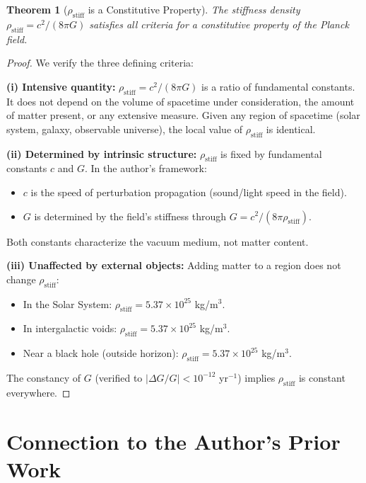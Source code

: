 \documentclass[11pt,a4paper]{article}
\newcommand{\rhostiff}{\ensuremath{\rho_{\mathrm{stiff}}}}
\newtheorem{theorem}{Theorem}
\theoremstyle{definition}
\begin{document}
\begin{theorem}[$\rhostiff$ is a Constitutive Property]
\label{thm:rho_stiff_constitutive}
The stiffness density $\rhostiff = c^2/(8\pi G)$ satisfies all criteria for a constitutive property of the Planck field.
\end{theorem}

\begin{proof}
We verify the three defining criteria:

\textbf{(i) Intensive quantity:} $\rhostiff = c^2/(8\pi G)$ is a ratio of fundamental constants. It does not depend on the volume of spacetime under consideration, the amount of matter present, or any extensive measure. Given any region of spacetime (solar system, galaxy, observable universe), the local value of $\rhostiff$ is identical.

\textbf{(ii) Determined by intrinsic structure:} $\rhostiff$ is fixed by fundamental constants $c$ and $G$. In the author's framework:
\begin{itemize}
    \item $c$ is the speed of perturbation propagation (sound/light speed in the field).
    \item $G$ is determined by the field's stiffness through $G = c^2/(8\pi\rhostiff)$.
\end{itemize}
Both constants characterize the vacuum medium, not matter content.

\textbf{(iii) Unaffected by external objects:} Adding matter to a region does not change $\rhostiff$:
\begin{itemize}
    \item In the Solar System: $\rhostiff = 5.37 \times 10^{25}$ kg/m$^3$.
    \item In intergalactic voids: $\rhostiff = 5.37 \times 10^{25}$ kg/m$^3$.
    \item Near a black hole (outside horizon): $\rhostiff = 5.37 \times 10^{25}$ kg/m$^3$.
\end{itemize}
The constancy of $G$ (verified to $|\Delta G/G| < 10^{-12}$ yr$^{-1}$) implies $\rhostiff$ is constant everywhere. \qedhere
\end{proof}

\section{Connection to the Author's Prior Work}
\label{sec:prior_work}
\end{document}
